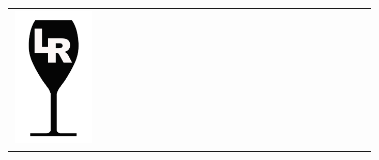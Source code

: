 {\begin{center}
\begin{tabular}{ >{\centering\arraybackslash}p{0.18\linewidth}  >{\centering\arraybackslash}p{0.18\linewidth}  >{\centering\arraybackslash}p{0.18\linewidth}  >{\centering\arraybackslash}p{0.18\linewidth}}
\includegraphics[scale=0.021, trim= 0em -5em -5em -5em,]{Icones/icon_languedoc_black.pdf}
&

\end{tabular}
\end{center}}
